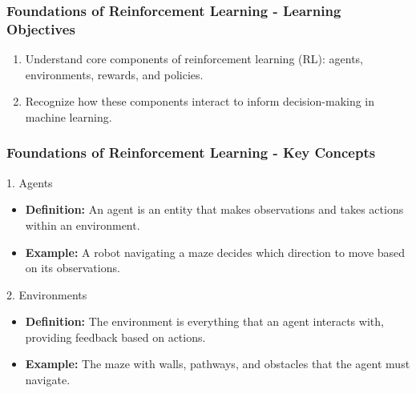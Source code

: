 \documentclass[aspectratio=169]{beamer}
\begin{document}
\begin{frame}[fragile]
    \frametitle{Foundations of Reinforcement Learning - Learning Objectives}
    \begin{enumerate}
        \item Understand core components of reinforcement learning (RL): agents, environments, rewards, and policies.
        \item Recognize how these components interact to inform decision-making in machine learning.
    \end{enumerate}
\end{frame}

\begin{frame}[fragile]
    \frametitle{Foundations of Reinforcement Learning - Key Concepts}
    \begin{block}{1. Agents}
        \begin{itemize}
            \item \textbf{Definition:} An agent is an entity that makes observations and takes actions within an environment.
            \item \textbf{Example:} A robot navigating a maze decides which direction to move based on its observations.
        \end{itemize}
    \end{block}

    \begin{block}{2. Environments}
        \begin{itemize}
            \item \textbf{Definition:} The environment is everything that an agent interacts with, providing feedback based on actions.
            \item \textbf{Example:} The maze with walls, pathways, and obstacles that the agent must navigate.
        \end{itemize}
    \end{block}
\end{frame}
\end{document}
